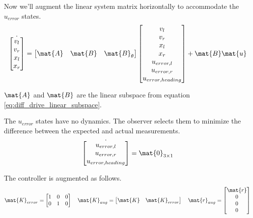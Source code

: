 Now we'll augment the linear system matrix horizontally to accommodate the
$u_{error}$ states.
\begin{equation}
  \dot{\begin{bmatrix}
    v_l \\
    v_r \\
    x_l \\
    x_r
  \end{bmatrix}} =
    \begin{bmatrix}
      \mat{A} & \mat{B} & \mat{B}_{\theta}
    \end{bmatrix}
    \begin{bmatrix}
      v_l \\
      v_r \\
      x_l \\
      x_r \\
      u_{error,l} \\
      u_{error,r} \\
      u_{error,heading}
    \end{bmatrix} + \mat{B}\mat{u}
\end{equation}

$\mat{A}$ and $\mat{B}$ are the linear subspace from equation
\eqref{eq:diff_drive_linear_subspace}.

The $u_{error}$ states have no dynamics. The observer selects them to minimize
the difference between the expected and actual measurements.
\begin{equation}
  \dot{\begin{bmatrix}
    u_{error,l} \\
    u_{error,r} \\
    u_{error,heading}
  \end{bmatrix}} = \mat{0}_{3 \times 1}
\end{equation}

The controller is augmented as follows.
\begin{equation}
  \mat{K}_{error} =
  \begin{bmatrix}
    1 & 0 & 0 \\
    0 & 1 & 0
  \end{bmatrix}
  \quad
  \mat{K}_{aug} = \begin{bmatrix}
    \mat{K} & \mat{K}_{error}
  \end{bmatrix}
  \quad
  \mat{r}_{aug} = \begin{bmatrix}
    \mat{r} \\
    0 \\
    0 \\
    0
  \end{bmatrix}
\end{equation}

